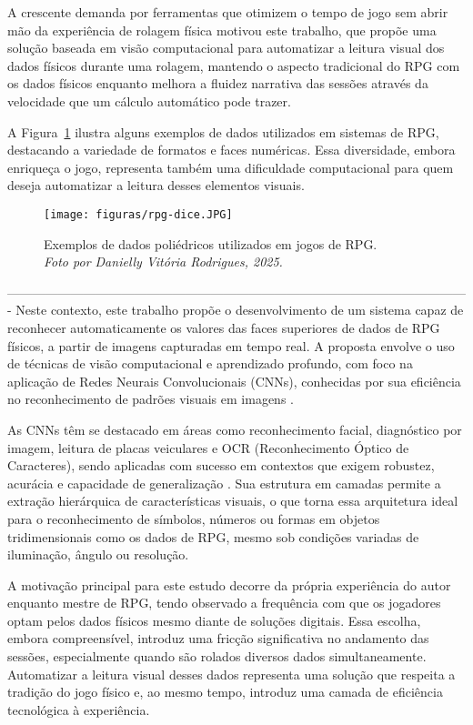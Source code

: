 A crescente demanda por ferramentas que otimizem o tempo de jogo sem abrir mão da experiência de rolagem física
 motivou este trabalho, que propõe uma solução baseada em visão computacional para automatizar a leitura visual dos
dados físicos durante uma rolagem, mantendo o aspecto tradicional do RPG com os dados físicos enquanto melhora 
a fluidez narrativa das sessões através da velocidade que um cálculo automático pode trazer.

A Figura~\ref{fig:dados-rpg} ilustra alguns exemplos de dados utilizados em sistemas de RPG, destacando a
variedade de formatos e faces numéricas. Essa diversidade, embora enriqueça o jogo, representa também uma
dificuldade computacional para quem deseja automatizar a leitura desses elementos visuais.

\begin{figure}[H]
    \centering
    \texttt{[image: figuras/rpg-dice.JPG]}
    \caption[Exemplos de dados poliédricos utilizados em jogos de RPG.]{%
    Exemplos de dados poliédricos utilizados em jogos de RPG.\\
    \textit{Foto por Danielly Vitória Rodrigues, 2025.}}
    \label{fig:dados-rpg}
\end{figure}

-------------------------------------------------------------------------------------------------------------
Neste contexto, este trabalho propõe o desenvolvimento de um sistema capaz de reconhecer automaticamente os
valores das faces superiores de dados de RPG físicos, a partir de imagens capturadas em tempo real. A proposta
envolve o uso de técnicas de visão computacional e aprendizado profundo, com foco na aplicação de Redes Neurais
Convolucionais (CNNs), conhecidas por sua eficiência no reconhecimento de padrões visuais em imagens
\cite{lecun1998gradient, ibm_cnn, datacamp_cnn}.

As CNNs têm se destacado em áreas como reconhecimento facial, diagnóstico por imagem, leitura de placas
veiculares e OCR (Reconhecimento Óptico de Caracteres), sendo aplicadas com sucesso em contextos que exigem
robustez, acurácia e capacidade de generalização \cite{lecun1998gradient, goodfellow2016deep}. Sua estrutura
em camadas permite a extração hierárquica de características visuais, o que torna essa arquitetura ideal para
o reconhecimento de símbolos, números ou formas em objetos tridimensionais como os dados de RPG, mesmo sob
condições variadas de iluminação, ângulo ou resolução.

A motivação principal para este estudo decorre da própria experiência do autor enquanto mestre de RPG, tendo
observado a frequência com que os jogadores optam pelos dados físicos mesmo diante de soluções digitais. Essa
escolha, embora compreensível, introduz uma fricção significativa no andamento das sessões, especialmente
quando são rolados diversos dados simultaneamente. Automatizar a leitura visual desses dados representa uma
solução que respeita a tradição do jogo físico e, ao mesmo tempo, introduz uma camada de eficiência
tecnológica à experiência.

